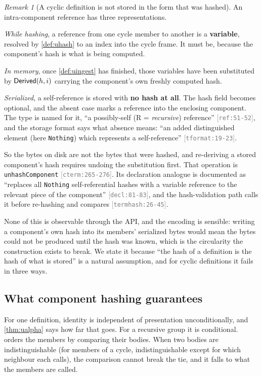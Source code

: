 \documentclass[11pt]{article}
\theoremstyle{definition}
\theoremstyle{plain}
\theoremstyle{remark}
\newtheorem{remark}{Remark}[section]
\newcommand{\src}[1]{{\footnotesize\textcolor{gray}{[\texttt{#1}]}}}
\begin{document}
\begin{remark}[A cyclic definition is not stored in the form that was hashed]\label{rem:unhash}
An intra-component reference has three representations.

\emph{While hashing}, a reference from one cycle member to another is a \textbf{variable}, resolved
by \cref{def:uhash} to an index into the cycle frame. It must be, because the component's hash is
what is being computed.

\emph{In memory}, once \cref{def:uingest} has finished, those variables have been substituted by
$\mathsf{Derived}(h,i)$ carrying the component's own freshly computed hash.

\emph{Serialized}, a self-reference is stored with \textbf{no hash at all}. The hash field becomes
optional, and the absent case marks a reference into the enclosing component. The type is named for
it, ``a possibly-self (R = \emph{recursive}) reference'' \src{ref:51-52}, and the storage format says
what absence means: ``an added distinguished element (here \texttt{Nothing}) which represents a
self-reference'' \src{tformat:19-23}.

So the bytes on disk are not the bytes that were hashed, and re-deriving a stored component's hash
requires undoing the substitution first. That operation is \texttt{unhashComponent}
\src{cterm:265-276}. Its declaration analogue is documented as ``replaces all \texttt{Nothing}
self-referential hashes with a variable reference to the relevant piece of the component''
\src{decl:81-83}, and the hash-validation path calls it before re-hashing and compares
\src{termhash:26-45}.

None of this is observable through the API, and the encoding is sensible: writing a component's own
hash into its members' serialized bytes would mean the bytes could not be produced until the hash was
known, which is the circularity the construction exists to break. We state it because ``the hash of
a definition is the hash of what is stored'' is a natural assumption, and for cyclic definitions it
fails in three ways.
\end{remark}

\subsection{What component hashing guarantees}

For one definition, identity is independent of presentation unconditionally, and \cref{thm:ualpha}
says how far that goes. For a recursive group it is conditional.  orders the
members by comparing their bodies. When two bodies are indistinguishable (for members of a cycle,
indistinguishable except for which neighbour each calls), the comparison cannot break the tie, and it
falls to what the members are called.
\end{document}
